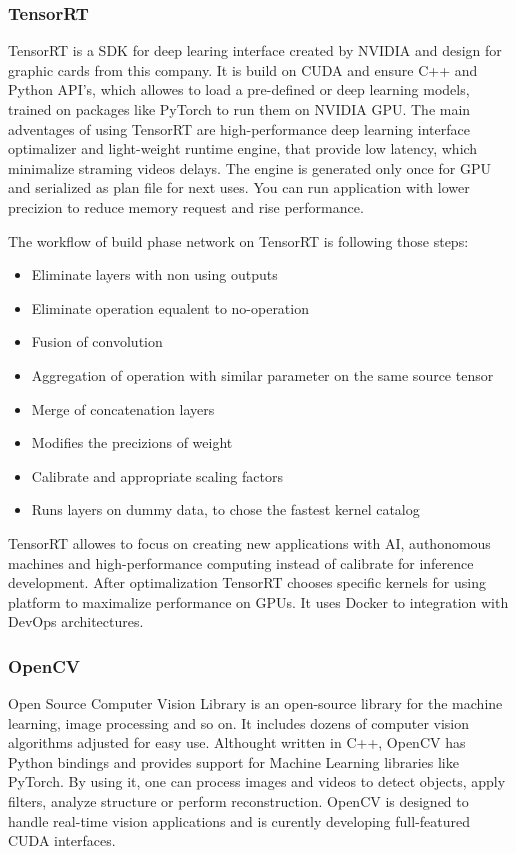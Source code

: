 \documentclass[../Main.tex]{subfiles}
\begin{document}
    \subsubsection{TensorRT} \label{trt_chapter}
    TensorRT is a SDK for deep learing interface created by NVIDIA and design for graphic cards from this company. It is build on CUDA and ensure C++ and Python API's, which allowes to load a pre-defined or deep learning models, trained on packages like PyTorch to run them on NVIDIA GPU. The main adventages of using TensorRT are high-performance deep learning interface optimalizer and light-weight runtime engine, that provide low latency, which minimalize straming videos delays. The engine is generated only once for GPU and serialized as plan file for next uses. You can run application with lower precizion to reduce memory request and rise performance. 
    
    The workflow of build phase network on TensorRT is following those steps:
    \begin{itemize}
        \item Eliminate layers with non using outputs
        \item Eliminate operation equalent to no-operation
        \item Fusion of convolution
        \item Aggregation of operation with similar parameter on the same source tensor 
        \item Merge of concatenation layers
        \item Modifies the precizions of weight 
        \item Calibrate and appropriate scaling factors
        \item Runs layers on dummy data, to chose the fastest kernel catalog
    \end{itemize}
    
    TensorRT allowes to focus on creating new applications with AI, authonomous machines and high-performance computing instead of calibrate for inference development. After optimalization TensorRT chooses specific kernels for using platform to maximalize performance on GPUs. It uses Docker to integration with DevOps architectures.
    
    
    
    \subsubsection{OpenCV}
    Open Source Computer Vision Library is an open-source library for the machine learning, image processing and so on. It includes dozens of computer vision algorithms adjusted for easy use. Althought written in C++, OpenCV has Python bindings and provides support for Machine Learning libraries like PyTorch.  By using it, one can process images and videos to detect objects, apply filters, analyze structure or perform reconstruction. OpenCV is designed to handle real-time vision applications and is curently developing full-featured CUDA interfaces.
\end{document}
